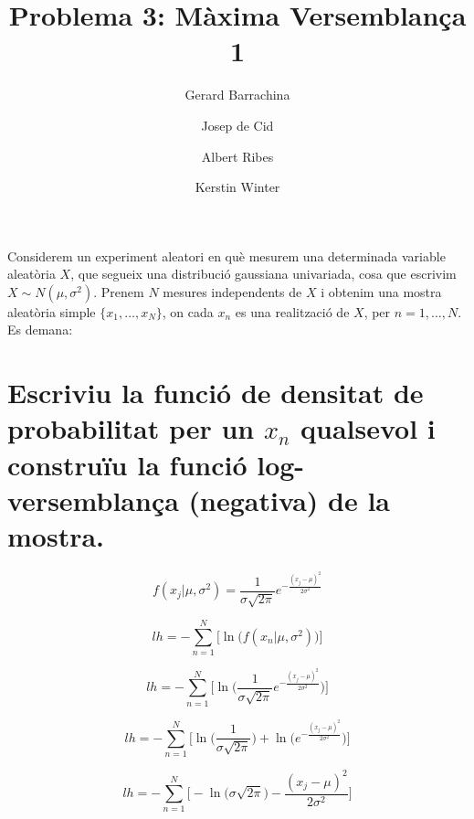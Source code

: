 \documentclass[a4paper,10pt]{article}
\title{Problema 3: Màxima Versemblança 1}
\author{
Gerard Barrachina
\and
Josep de Cid
\and
Albert Ribes
\and
Kerstin Winter
}
\begin{document}
\maketitle

% 


Considerem un experiment aleatori en què mesurem una determinada variable aleatòria $X$,
que segueix
una distribució gaussiana univariada, cosa que escrivim $X \sim N(\mu, \sigma^2)$. Prenem $N$
mesures independents de $X$ i obtenim una mostra aleatòria simple $\{x_1, \dots, x_N\}$,
on cada $x_n$ es una realització de $X$, per $n = 1,\dots,N$. Es demana:

\section{Escriviu la funció de densitat de probabilitat per un $x_n$ qualsevol i construïu la funció log-versemblança (negativa) de la mostra.}

\begin{equation*}
f(x_j | \mu, \sigma^2) = \frac{1}{\sigma\sqrt{2\pi}}e^{-\frac{(x_j - \mu)^2}{2\sigma^2}}
\end{equation*}

\begin{equation*}
lh = - \sum_{n = 1}^{N} \Big[ \ln{\big( f(x_n | \mu, \sigma^2)\big)} \Big]
\end{equation*}

\begin{equation*}
lh = - \sum_{n = 1}^{N} \Big[ \ln{\Big(  \frac{1}{\sigma\sqrt{2\pi}}e^{-\frac{(x_j - \mu)^2}{2\sigma^2}} \Big)} \Big]
\end{equation*}

\begin{equation*}
lh = - \sum_{n = 1}^{N} \Big[ \ln{\Big(  \frac{1}{\sigma\sqrt{2\pi}}\Big)} + \ln{\Big(e^{-\frac{(x_j - \mu)^2}{2\sigma^2}} \Big)} \Big]
\end{equation*}

\begin{equation*}
lh = - \sum_{n = 1}^{N} \Big[ -\ln{\big(  \sigma\sqrt{2\pi} \big)} - \frac{(x_j - \mu)^2}{2\sigma^2} \Big]
\end{equation*}
\end{document}
